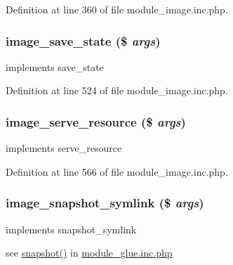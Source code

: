 Definition at line 360 of file module\_\-image.inc.php.

\hypertarget{module__image_8inc_8php_ac26ea1448f0b7ed835907cf7c22b60ca}{
\subsubsection[{image\_\-save\_\-state}]{\setlength{\rightskip}{0pt plus 5cm}image\_\-save\_\-state (\$ {\em args})}}
\label{module__image_8inc_8php_ac26ea1448f0b7ed835907cf7c22b60ca}
implements save\_\-state 

Definition at line 524 of file module\_\-image.inc.php.

\hypertarget{module__image_8inc_8php_abb6646bfaa6a012e620cdaaa0bc3c807}{
\subsubsection[{image\_\-serve\_\-resource}]{\setlength{\rightskip}{0pt plus 5cm}image\_\-serve\_\-resource (\$ {\em args})}}
\label{module__image_8inc_8php_abb6646bfaa6a012e620cdaaa0bc3c807}
implements serve\_\-resource 

Definition at line 566 of file module\_\-image.inc.php.

\hypertarget{module__image_8inc_8php_a65d33fafe2da58d0f87f2df1fedbbe62}{
\subsubsection[{image\_\-snapshot\_\-symlink}]{\setlength{\rightskip}{0pt plus 5cm}image\_\-snapshot\_\-symlink (\$ {\em args})}}
\label{module__image_8inc_8php_a65d33fafe2da58d0f87f2df1fedbbe62}
implements snapshot\_\-symlink

see \hyperlink{module__glue_8inc_8php_a5d3ad02088eee566589cd47fe0dc889a}{snapshot()} in \hyperlink{module__glue_8inc_8php}{module\_\-glue.inc.php} 

